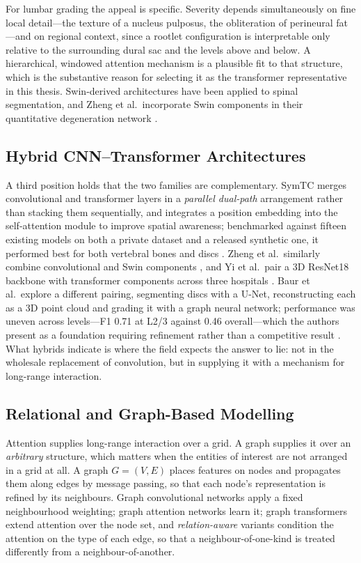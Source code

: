 For lumbar grading the appeal is specific. Severity depends simultaneously on
fine local detail---the texture of a nucleus pulposus, the obliteration of
perineural fat---and on regional context, since a rootlet configuration is
interpretable only relative to the surrounding dural sac and the levels above
and below. A hierarchical, windowed attention mechanism is a plausible fit to
that structure, which is the substantive reason for selecting it as the
transformer representative in this thesis. Swin-derived architectures have been
applied to spinal segmentation, and Zheng et al.\ incorporate Swin components in
their quantitative degeneration network \cite{zheng2022deep}.

\subsection{Hybrid CNN--Transformer Architectures}
\label{sec:lr-hybrids}

A third position holds that the two families are complementary. SymTC merges
convolutional and transformer layers in a \emph{parallel dual-path} arrangement
rather than stacking them sequentially, and integrates a position embedding into
the self-attention module to improve spatial awareness; benchmarked against
fifteen existing models on both a private dataset and a released synthetic one,
it performed best for both vertebral bones and discs \cite{chen2024symtc}. Zheng
et al.\ similarly combine convolutional and Swin components
\cite{zheng2022deep}, and Yi et al.\ pair a 3D ResNet18 backbone with transformer
components across three hospitals \cite{yi2023deep}. Baur et al.\ explore a
different pairing, segmenting discs with a U-Net, reconstructing each as a 3D
point cloud and grading it with a graph neural network; performance was uneven
across levels---F1 0.71 at L2/3 against 0.46 overall---which the authors present
as a foundation requiring refinement rather than a competitive result
\cite{baur2024automated}. What hybrids indicate is where the field expects the
answer to lie: not in the wholesale replacement of convolution, but in supplying
it with a mechanism for long-range interaction.

\subsection{Relational and Graph-Based Modelling}
\label{sec:lr-graphs}

Attention supplies long-range interaction over a grid. A graph supplies it over
an \emph{arbitrary} structure, which matters when the entities of interest are
not arranged in a grid at all. A graph $G = (V, E)$ places features on nodes and
propagates them along edges by message passing, so that each node's
representation is refined by its neighbours. Graph convolutional networks apply
a fixed neighbourhood weighting; graph attention networks learn it; graph
transformers extend attention over the node set, and \emph{relation-aware}
variants condition the attention on the type of each edge, so that a
neighbour-of-one-kind is treated differently from a neighbour-of-another.

